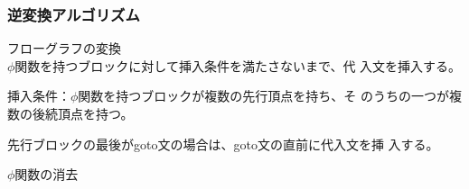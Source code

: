 \documentclass[ckj,dvipdfmx]{beamer}
\begin{document}
\begin{frame}
  \frametitle{逆変換アルゴリズム}

  \begin{trivlist}
    \item [1.] フローグラフの変換\\
    $\phi$関数を持つブロックに対して挿入条件を満たさないまで、代
    入文を挿入する。

    \vspace*{1zw}

    挿入条件：$\phi$関数を持つブロックが複数の先行頂点を持ち、そ
    のうちの一つが複数の後続頂点を持つ。

    先行ブロックの最後がgoto文の場合は、goto文の直前に代入文を挿
    入する。
    \item [2.] $\phi$関数の消去
  \end{trivlist}

\end{frame}
\end{document}
